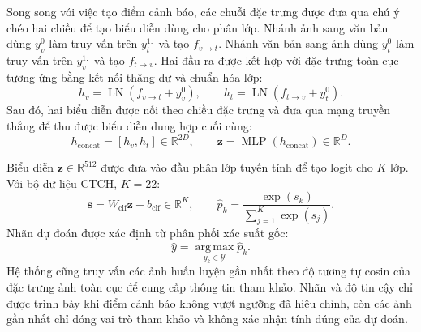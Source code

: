 Song song với việc tạo điểm cảnh báo, các chuỗi đặc trưng được đưa qua chú ý chéo hai chiều để tạo biểu diễn dùng cho phân lớp. Nhánh ảnh sang văn bản dùng $y_v^0$ làm truy vấn trên $y_t^{1:}$ và tạo $f_{v\to t}$. Nhánh văn bản sang ảnh dùng $y_t^0$ làm truy vấn trên $y_v^{1:}$ và tạo $f_{t\to v}$. Hai đầu ra được kết hợp với đặc trưng toàn cục tương ứng bằng kết nối thặng dư và chuẩn hóa lớp:
\begin{equation}
h_v=\operatorname{LN}\!\left(f_{v\to t}+y_v^0\right),
\qquad
h_t=\operatorname{LN}\!\left(f_{t\to v}+y_t^0\right).
\end{equation}
Sau đó, hai biểu diễn được nối theo chiều đặc trưng và đưa qua mạng truyền thẳng để thu được biểu diễn dung hợp cuối cùng:
\begin{equation}
h_{\mathrm{concat}}=[h_v,h_t]\in\mathbb{R}^{2D},
\qquad
\boldsymbol{z}=\operatorname{MLP}\!\left(h_{\mathrm{concat}}\right)
\in\mathbb{R}^{D}.
\end{equation}

Biểu diễn $\boldsymbol{z}\in\mathbb{R}^{512}$ được đưa vào đầu phân lớp tuyến tính để tạo logit cho $K$ lớp. Với bộ dữ liệu CTCH, $K=22$:
\begin{equation}
\boldsymbol{s}=W_{\mathrm{clf}}\boldsymbol{z}+b_{\mathrm{clf}}
\in\mathbb{R}^{K},
\qquad
\widehat{p}_k=\frac{\exp(s_k)}{\sum_{j=1}^{K}\exp(s_j)}.
\end{equation}
Nhãn dự đoán được xác định từ phân phối xác suất gốc:
\begin{equation}
\widehat{y}
=
\operatorname*{arg\,max}_{y_k\in\mathcal{Y}}
\widehat{p}_k.
\label{eq:ch3_online_prediction}
\end{equation}
Hệ thống cũng truy vấn các ảnh huấn luyện gần nhất theo độ tương tự cosin của đặc trưng ảnh toàn cục để cung cấp thông tin tham khảo. Nhãn và độ tin cậy chỉ được trình bày khi điểm cảnh báo không vượt ngưỡng đã hiệu chỉnh, còn các ảnh gần nhất chỉ đóng vai trò tham khảo và không xác nhận tính đúng của dự đoán.

